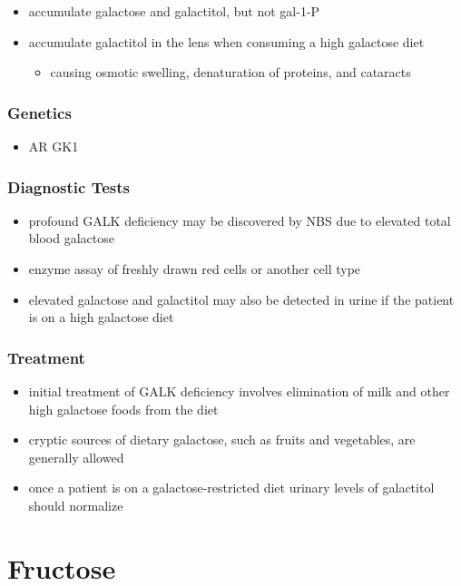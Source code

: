 \documentclass[12pt]{scrartcl}
\begin{document}

\begin{itemize}
\item accumulate galactose and galactitol, but not gal-1-P
\item accumulate galactitol in the lens when consuming a high galactose diet
\begin{itemize}
\item causing osmotic swelling, denaturation of proteins, and cataracts
\end{itemize}
\end{itemize}

\subsubsection{Genetics}
\label{sec:org452178f}
\begin{itemize}
\item AR GK1
\end{itemize}
\subsubsection{Diagnostic Tests}
\label{sec:orge1ba3c5}
\begin{itemize}
\item profound GALK deficiency may be discovered by NBS due to elevated total blood galactose
\item enzyme assay of freshly drawn red cells or another cell type
\item elevated galactose and galactitol may also be detected in urine if
the patient is on a high galactose diet
\end{itemize}

\subsubsection{Treatment}
\label{sec:orgb9ae26f}
\begin{itemize}
\item initial treatment of GALK deficiency involves elimination of milk
and other high galactose foods from the diet
\item cryptic sources of dietary galactose, such as fruits and vegetables,
are generally allowed
\item once a patient is on a galactose-restricted diet urinary levels of
galactitol should normalize
\end{itemize}
\section{Fructose}
\label{sec:orgcb902e2}
\end{document}
